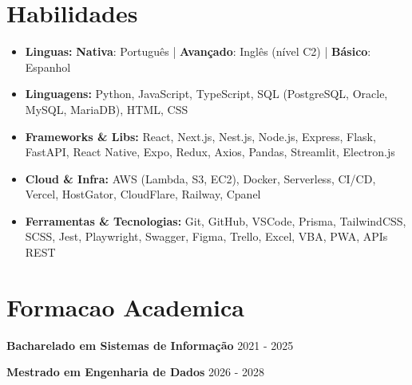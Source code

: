 \documentclass[a4paper,11pt]{article}
\begin{document}
\section*{Habilidades}
\vspace{0.6em}
\begin{itemize}
\item \textbf{Linguas:} \textbf{Nativa}: Português | \textbf{Avançado}: Inglês (nível C2) | \textbf{Básico}: Espanhol
\item \textbf{Linguagens:} Python, JavaScript, TypeScript, SQL (PostgreSQL, Oracle, MySQL, MariaDB), HTML, CSS
\item \textbf{Frameworks \& Libs:} React, Next.js, Nest.js, Node.js, Express, Flask, FastAPI, React Native, Expo, Redux, Axios, Pandas, Streamlit, Electron.js
\item \textbf{Cloud \& Infra:} AWS (Lambda, S3, EC2), Docker, Serverless, CI/CD, Vercel, HostGator, CloudFlare, Railway, Cpanel
\item \textbf{Ferramentas \& Tecnologias:} Git, GitHub, VSCode, Prisma, TailwindCSS, SCSS, Jest, Playwright, Swagger, Figma, Trello, Excel, VBA, PWA, APIs REST
\end{itemize}

\section*{Formacao Academica}
\vspace{0.3em}
\noindent\textbf{Bacharelado em Sistemas de Informação} \hfill {\color{light}\small 2021 - 2025}

\vspace{0.6em}

\noindent\textbf{Mestrado em Engenharia de Dados} \hfill {\color{light}\small 2026 - 2028}

\end{document}
